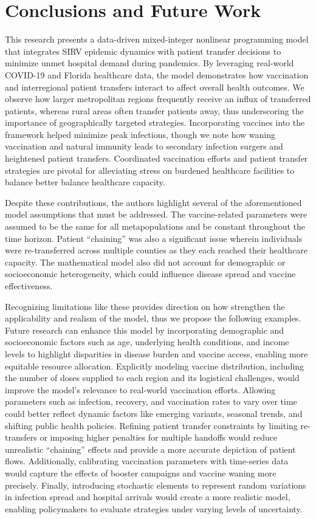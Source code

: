 \documentclass{article}
\begin{document}
\section{Conclusions and Future Work}
This research presents a data-driven mixed-integer nonlinear programming model that integrates SIRV epidemic dynamics with patient transfer decisions to minimize unmet hospital demand during pandemics. By leveraging real-world COVID-19 and Florida healthcare data, the model demonstrates how vaccination and interregional patient transfers interact to affect overall health outcomes. We observe how larger metropolitan regions frequently receive an influx of transferred patients, whereas rural areas often transfer patients away, thus underscoring the importance of geographically targeted strategies. Incorporating vaccines into the framework helped minimize peak infections, though we note how waning vaccination and natural immunity leads to secondary infection surgers and heightened patient transfers. Coordinated vaccination efforts and patient transfer strategies are pivotal for alleviating stress on burdened healthcare facilities to balance better balance healthcare capacity. 

Despite these contributions, the authors highlight several of the aforementioned model assumptions that must be addressed. The vaccine-related parameters were assumed to be the same for all metapopulations and be constant throughout the time horizon. Patient ``chaining'' was also a significant issue wherein individuals were re-transferred across multiple counties as they each reached their healthcare capacity. The mathematical model also did not account for demographic or socioeconomic heterogeneity, which could influence disease spread and vaccine effectiveness. 

Recognizing limitations like these provides direction on how strengthen the applicability and realism of the model, thus we propose the following examples. Future research can enhance this model by incorporating demographic and socioeconomic factors such as age, underlying health conditions, and income levels to highlight disparities in disease burden and vaccine access, enabling more equitable resource allocation. Explicitly modeling vaccine distribution, including the number of doses supplied to each region and its logistical challenges, would improve the model's relevance to real-world vaccination efforts. Allowing parameters such as infection, recovery, and vaccination rates to vary over time could better reflect dynamic factors like emerging variants, seasonal trends, and shifting public health policies. Refining patient transfer constraints by limiting re-transfers or imposing higher penalties for multiple handoffs would reduce unrealistic ``chaining'' effects and provide a more accurate depiction of patient flows. Additionally, calibrating vaccination parameters with time-series data would capture the effects of booster campaigns and vaccine waning more precisely. Finally, introducing stochastic elements to represent random variations in infection spread and hospital arrivals would create a more realistic model, enabling policymakers to evaluate strategies under varying levels of uncertainty.
\end{document}

